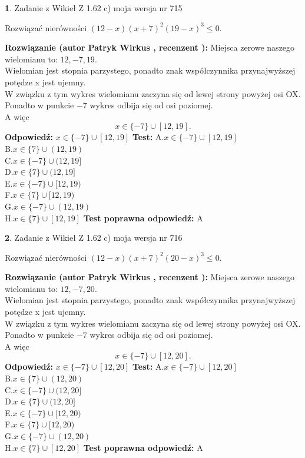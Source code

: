 \documentclass[12pt, a4paper]{article}
\theoremstyle{definition} %
\newtheorem{zad}{}
\newcommand{\zadStart}[1]{\begin{zad}#1\newline}
\newcommand{\zadStop}{\end{zad}}
\newcommand{\rozwStart}[2]{\noindent \textbf{Rozwiązanie (autor #1 , recenzent #2): }\newline}
\newcommand{\rozwStop}{\newline}
\newcommand{\odpStart}{\noindent \textbf{Odpowiedź:}\newline}
\newcommand{\odpStop}{\newline}
\newcommand{\testStart}{\noindent \textbf{Test:}\newline}
\newcommand{\testStop}{\newline}
\newcommand{\kluczStart}{\noindent \textbf{Test poprawna odpowiedź:}\newline}
\newcommand{\kluczStop}{\newline}
\begin{document}
\zadStart{Zadanie z Wikieł Z 1.62 c) moja wersja nr 715}

Rozwiązać nierówności $(12-x)(x+7)^{2}(19-x)^{3}\le0$.
\zadStop
\rozwStart{Patryk Wirkus}{}
Miejsca zerowe naszego wielomianu to: $12, -7, 19$.\\
Wielomian jest stopnia parzystego, ponadto znak współczynnika przy\linebreak najwyższej potędze x jest ujemny.\\ W związku z tym wykres wielomianu zaczyna się od lewej strony powyżej osi OX.\\
Ponadto w punkcie $-7$ wykres odbija się od osi poziomej.\\
A więc $$x \in \{-7\} \cup [12,19].$$
\rozwStop
\odpStart
$x \in \{-7\} \cup [12,19]$
\odpStop
\testStart
A.$x \in \{-7\} \cup [12,19]$\\
B.$x \in \{7\} \cup (12,19)$\\
C.$x \in \{-7\} \cup (12,19]$\\
D.$x \in \{7\} \cup (12,19]$\\
E.$x \in \{-7\} \cup [12,19)$\\
F.$x \in \{7\} \cup [12,19)$\\
G.$x \in \{-7\} \cup (12,19)$\\
H.$x \in \{7\} \cup [12,19]$
\testStop
\kluczStart
A
\kluczStop



\zadStart{Zadanie z Wikieł Z 1.62 c) moja wersja nr 716}

Rozwiązać nierówności $(12-x)(x+7)^{2}(20-x)^{3}\le0$.
\zadStop
\rozwStart{Patryk Wirkus}{}
Miejsca zerowe naszego wielomianu to: $12, -7, 20$.\\
Wielomian jest stopnia parzystego, ponadto znak współczynnika przy\linebreak najwyższej potędze x jest ujemny.\\ W związku z tym wykres wielomianu zaczyna się od lewej strony powyżej osi OX.\\
Ponadto w punkcie $-7$ wykres odbija się od osi poziomej.\\
A więc $$x \in \{-7\} \cup [12,20].$$
\rozwStop
\odpStart
$x \in \{-7\} \cup [12,20]$
\odpStop
\testStart
A.$x \in \{-7\} \cup [12,20]$\\
B.$x \in \{7\} \cup (12,20)$\\
C.$x \in \{-7\} \cup (12,20]$\\
D.$x \in \{7\} \cup (12,20]$\\
E.$x \in \{-7\} \cup [12,20)$\\
F.$x \in \{7\} \cup [12,20)$\\
G.$x \in \{-7\} \cup (12,20)$\\
H.$x \in \{7\} \cup [12,20]$
\testStop
\kluczStart
A
\kluczStop
\end{document}
